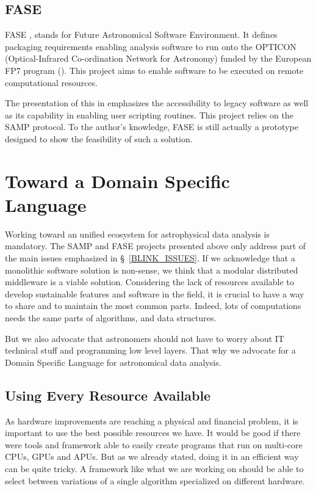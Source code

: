 		\subsection{FASE}
			FASE \citep{Granet}, stands for Future Astronomical Software Environment. It defines packaging requirements enabling analysis software to run onto the OPTICON (Optical-Infrared Co-ordination Network for Astronomy) funded by the European FP7 program (\cite{Fase}). This project aims to enable software to be executed on remote computational resources.
			
			The presentation of this in \citet{Grosbol} emphasizes the accessibility to legacy software as well as its capability in enabling user scripting routines. This project relies on the SAMP protocol. To the author's knowledge, FASE is still actually a prototype designed to show the feasibility of such a solution.

	\section{Toward a Domain Specific Language}
		Working toward an unified ecosystem for astrophysical data analysis is mandatory. The SAMP and FASE projects presented above only address part of the main issues emphasized in \S~\ref{BLINK_ISSUES}. If we acknowledge that a monolithic software solution is non-sense, we think that a modular distributed middleware is a viable solution. Considering the lack of resources available to develop sustainable features and software in the field, it is crucial to have a way to share and to maintain the most common parts. Indeed, lots of computations needs the same parts of algorithms, and data structures.
		
		But we also advocate that astronomers should not have to worry about IT technical stuff and programming low level layers. That why we advocate for a Domain Specific Language for astronomical data analysis.

		\subsection{Using Every Resource Available}
			As hardware improvements are reaching a physical and financial problem, it is important to use the best possible resources we have. It would be good if there were tools and framework able to easily create programs that run on multi-core CPUs, GPUs and APUs. But as we already stated, doing it in an efficient way can be quite tricky. A framework like what we are working on should be able to select between variations of a single algorithm specialized on different hardware.

